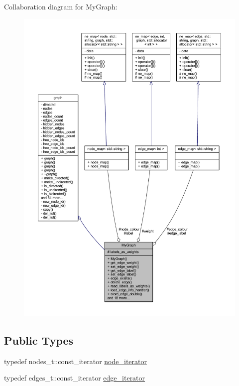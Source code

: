 Collaboration diagram for My\+Graph\+:\nopagebreak
\begin{figure}[H]
\begin{center}
\leavevmode
\includegraphics[width=350pt]{class_my_graph__coll__graph}
\end{center}
\end{figure}
\subsection*{Public Types}
\begin{DoxyCompactItemize}
\item 
typedef nodes\+\_\+t\+::const\+\_\+iterator \mbox{\hyperlink{classgraph_a2cb374b84c133ce13f94e73c3e5da7fa}{node\+\_\+iterator}}
\item 
typedef edges\+\_\+t\+::const\+\_\+iterator \mbox{\hyperlink{classgraph_a818d3766018eb0af91d520ce2150203c}{edge\+\_\+iterator}}
\end{DoxyCompactItemize}
